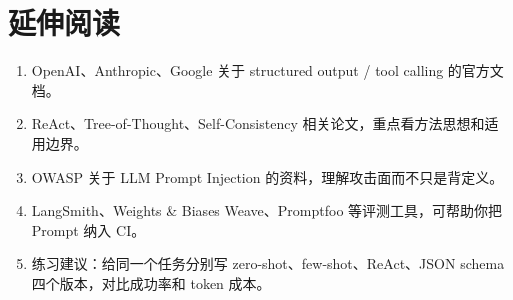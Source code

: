 \section{延伸阅读}

\begin{enumerate}[leftmargin=2em]
\item OpenAI、Anthropic、Google 关于 structured output / tool calling 的官方文档。
\item ReAct、Tree-of-Thought、Self-Consistency 相关论文，重点看方法思想和适用边界。
\item OWASP 关于 LLM Prompt Injection 的资料，理解攻击面而不只是背定义。
\item LangSmith、Weights \& Biases Weave、Promptfoo 等评测工具，可帮助你把 Prompt 纳入 CI。
\item 练习建议：给同一个任务分别写 zero-shot、few-shot、ReAct、JSON schema 四个版本，对比成功率和 token 成本。
\end{enumerate}
